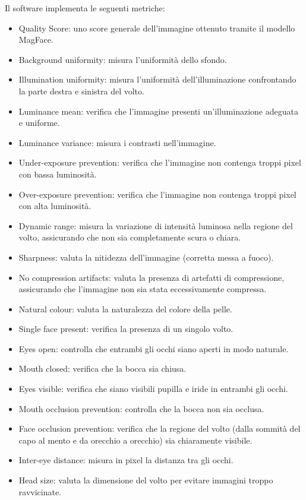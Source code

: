\documentclass[12pt,a4paper,openright,twoside]{book}
\begin{document}
Il software implementa le seguenti metriche: 
\begin{itemize}
    \item Quality Score: uno score generale dell'immagine ottenuto tramite il modello MagFace.
    \item Background uniformity: misura l'uniformità dello sfondo.
    \item Illumination uniformity: misura l'uniformità dell'illuminazione confrontando la parte destra e sinistra del volto.
    \item Luminance mean: verifica che l'immagine presenti un'illuminazione adeguata e uniforme.
    \item Luminance variance: misura i contrasti nell'immagine.
    \item Under-exposure prevention: verifica che l'immagine non contenga troppi pixel con bassa luminosità.
    \item Over-exposure prevention: verifica che l'immagine non contenga troppi pixel con alta luminosità.
    \item Dynamic range: misura la variazione di intensità luminosa nella regione del volto, assicurando che non sia completamente scura o chiara.
    \item Sharpness: valuta la nitidezza dell'immagine (corretta messa a fuoco).
    \item No compression artifacts: valuta la presenza di artefatti di compressione, assicurando che l'immagine non sia stata eccessivamente compressa.
    \item Natural colour: valuta la naturalezza del colore della pelle.
    \item Single face present: verifica la presenza di un singolo volto.
    \item Eyes open: controlla che entrambi gli occhi siano aperti in modo naturale.
    \item Mouth closed: verifica che la bocca sia chiusa.
    \item Eyes visible: verifica che siano visibili pupilla e iride in entrambi gli occhi.
    \item Mouth occlusion prevention: controlla che la bocca non sia occlusa.
    \item Face occlusion prevention: verifica che la regione del volto (dalla sommità del capo al mento e da orecchio a orecchio) sia chiaramente visibile.
    \item Inter-eye distance: misura in pixel la distanza tra gli occhi.
    \item Head size: valuta la dimensione del volto per evitare immagini troppo ravvicinate.

\end{itemize}
\end{document}
